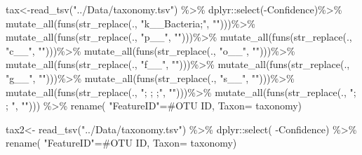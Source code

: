 \documentclass[]{interact}
\theoremstyle{plain}%
\theoremstyle{definition}
\theoremstyle{remark}
\newenvironment{Shaded}{\begin{snugshade}}{\end{snugshade}}
\newcommand{\AttributeTok}[1]{\textcolor[rgb]{0.77,0.63,0.00}{#1}}
\newcommand{\FunctionTok}[1]{\textcolor[rgb]{0.00,0.00,0.00}{#1}}
\newcommand{\NormalTok}[1]{#1}
\newcommand{\OtherTok}[1]{\textcolor[rgb]{0.56,0.35,0.01}{#1}}
\newcommand{\SpecialCharTok}[1]{\textcolor[rgb]{0.00,0.00,0.00}{#1}}
\newcommand{\StringTok}[1]{\textcolor[rgb]{0.31,0.60,0.02}{#1}}
\begin{document}
\begin{Shaded}
\begin{Highlighting}[]
\NormalTok{tax}\OtherTok{\textless{}{-}}\FunctionTok{read\_tsv}\NormalTok{(}\StringTok{"../Data/taxonomy.tsv"}\NormalTok{) }\SpecialCharTok{\%\textgreater{}\%}\NormalTok{ dplyr}\SpecialCharTok{::}\FunctionTok{select}\NormalTok{(}\SpecialCharTok{{-}}\NormalTok{Confidence)}\SpecialCharTok{\%\textgreater{}\%}
  \FunctionTok{mutate\_all}\NormalTok{(}\FunctionTok{funs}\NormalTok{(}\FunctionTok{str\_replace}\NormalTok{(., }\StringTok{"k\_\_Bacteria;"}\NormalTok{, }\StringTok{""}\NormalTok{)))}\SpecialCharTok{\%\textgreater{}\%} 
  \FunctionTok{mutate\_all}\NormalTok{(}\FunctionTok{funs}\NormalTok{(}\FunctionTok{str\_replace}\NormalTok{(., }\StringTok{"p\_\_"}\NormalTok{, }\StringTok{""}\NormalTok{)))}\SpecialCharTok{\%\textgreater{}\%} 
  \FunctionTok{mutate\_all}\NormalTok{(}\FunctionTok{funs}\NormalTok{(}\FunctionTok{str\_replace}\NormalTok{(., }\StringTok{"c\_\_"}\NormalTok{, }\StringTok{""}\NormalTok{)))}\SpecialCharTok{\%\textgreater{}\%} 
  \FunctionTok{mutate\_all}\NormalTok{(}\FunctionTok{funs}\NormalTok{(}\FunctionTok{str\_replace}\NormalTok{(., }\StringTok{"o\_\_"}\NormalTok{, }\StringTok{""}\NormalTok{)))}\SpecialCharTok{\%\textgreater{}\%} 
  \FunctionTok{mutate\_all}\NormalTok{(}\FunctionTok{funs}\NormalTok{(}\FunctionTok{str\_replace}\NormalTok{(., }\StringTok{"f\_\_"}\NormalTok{, }\StringTok{""}\NormalTok{)))}\SpecialCharTok{\%\textgreater{}\%} 
  \FunctionTok{mutate\_all}\NormalTok{(}\FunctionTok{funs}\NormalTok{(}\FunctionTok{str\_replace}\NormalTok{(., }\StringTok{"g\_\_"}\NormalTok{, }\StringTok{""}\NormalTok{)))}\SpecialCharTok{\%\textgreater{}\%} 
  \FunctionTok{mutate\_all}\NormalTok{(}\FunctionTok{funs}\NormalTok{(}\FunctionTok{str\_replace}\NormalTok{(., }\StringTok{"s\_\_"}\NormalTok{, }\StringTok{""}\NormalTok{)))}\SpecialCharTok{\%\textgreater{}\%} 
  \FunctionTok{mutate\_all}\NormalTok{(}\FunctionTok{funs}\NormalTok{(}\FunctionTok{str\_replace}\NormalTok{(., }\StringTok{"; ; ;"}\NormalTok{, }\StringTok{""}\NormalTok{)))}\SpecialCharTok{\%\textgreater{}\%} 
  \FunctionTok{mutate\_all}\NormalTok{(}\FunctionTok{funs}\NormalTok{(}\FunctionTok{str\_replace}\NormalTok{(., }\StringTok{"; ; "}\NormalTok{, }\StringTok{""}\NormalTok{))) }\SpecialCharTok{\%\textgreater{}\%} \FunctionTok{rename}\NormalTok{(}
    \StringTok{"FeatureID"}\OtherTok{=}\StringTok{\textasciigrave{}}\AttributeTok{\#OTU ID}\StringTok{\textasciigrave{}}\NormalTok{, }\AttributeTok{Taxon=}\NormalTok{ taxonomy)}

\NormalTok{tax2}\OtherTok{\textless{}{-}} \FunctionTok{read\_tsv}\NormalTok{(}\StringTok{"../Data/taxonomy.tsv"}\NormalTok{) }\SpecialCharTok{\%\textgreater{}\%}\NormalTok{ dplyr}\SpecialCharTok{::}\FunctionTok{select}\NormalTok{(}
  \SpecialCharTok{{-}}\NormalTok{Confidence) }\SpecialCharTok{\%\textgreater{}\%} \FunctionTok{rename}\NormalTok{(}
    \StringTok{"FeatureID"}\OtherTok{=}\StringTok{\textasciigrave{}}\AttributeTok{\#OTU ID}\StringTok{\textasciigrave{}}\NormalTok{, }\AttributeTok{Taxon=}\NormalTok{ taxonomy)}



\end{Highlighting}
\end{Shaded}
\end{document}
